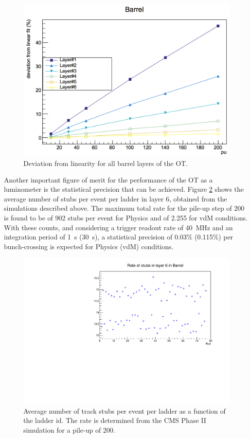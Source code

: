 \begin{figure}[h!]
\centering
\includegraphics[width=.6\linewidth]{tex/Part2/fig/OT/OT-deviation.png}
\caption{
 Deviation from linearity for all barrel layers of the OT. 
}
\label{fig:OT_deviation}
\end{figure}

Another important figure of merit for the performance of the OT as a luminometer is the statistical precision that can be achieved. Figure \ref{fig:OT_rates} shows the average number of stubs per event per ladder in layer 6, obtained from the simulations described above. The maximum total rate for the pile-up step of 200 is found to be of 902 stubs per event for Physics and of 2.255 for vdM conditions. With these counts, and considering a trigger readout rate of 40~MHz and an integration period of 1~s (30~s), a statistical precision of 0.03\% (0.115\%) per bunch-crossing is expected for Physics (vdM) conditions.   

\begin{figure}[h!]
\centering
\includegraphics[width=.6\linewidth]{tex/Part2/fig/OT/OT-Rates.pdf}
\caption{
  Average number of track stubs per event per ladder as a function of the ladder id.
  The rate is determined from the CMS Phase II simulation for a pile-up of 200. 
}
\label{fig:OT_rates}
\end{figure}

